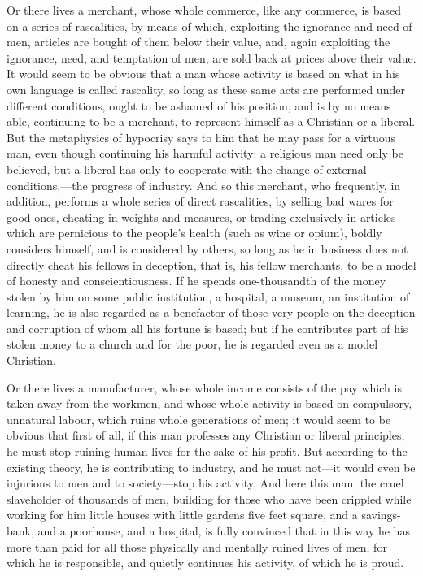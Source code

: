 \documentclass{book}
\begin{document}
Or there lives a merchant, whose whole commerce, like any commerce, is based on a series of rascalities, by means of which, exploiting the ignorance and need of men, articles are bought of them below their value, and, again exploiting the ignorance, need, and temptation of men, are sold back at prices above their value. It would seem to be obvious that a man whose activity is based on what in his own language is called rascality, so long as these same acts are performed under different conditions, ought to be ashamed of his position, and is by no means able, continuing to be a merchant, to represent himself as a Christian or a liberal. But the metaphysics of hypocrisy says to him that he may pass for a virtuous man, even though continuing his harmful activity: a religious man need only be believed, but a liberal has only to cooperate with the change of external conditions,—the progress of industry. And so this merchant, who frequently, in addition, performs a whole series of direct rascalities, by selling bad wares for good ones, cheating in weights and measures, or trading exclusively in articles which are pernicious to the people’s health (such as wine or opium), boldly considers himself, and is considered by others, so long as he in business does not directly cheat his fellows in deception, that is, his fellow merchants, to be a model of honesty and conscientiousness. If he spends one-thousandth of the money stolen by him on some public institution, a hospital, a museum, an institution of learning, he is also regarded as a benefactor of those very people on the deception and corruption of whom all his fortune is based; but if he contributes part of his stolen money to a church and for the poor, he is regarded even as a model Christian.

Or there lives a manufacturer, whose whole income consists of the pay which is taken away from the workmen, and whose whole activity is based on compulsory, unnatural labour, which ruins whole generations of men; it would seem to be obvious that first of all, if this man professes any Christian or liberal principles, he must stop ruining human lives for the sake of his profit. But according to the existing theory, he is contributing to industry, and he must not—it would even be injurious to men and to society—stop his activity. And here this man, the cruel slaveholder of thousands of men, building for those who have been crippled while working for him little houses with little gardens five feet square, and a savings-bank, and a poorhouse, and a hospital, is fully convinced that in this way he has more than paid for all those physically and mentally ruined lives of men, for which he is responsible, and quietly continues his activity, of which he is proud.
\end{document}
